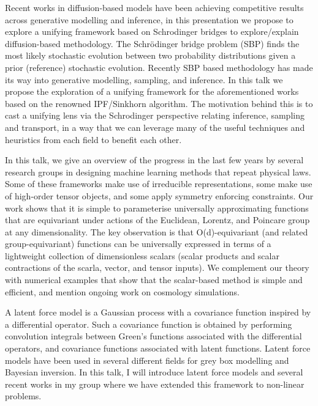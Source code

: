 \license

Recent works in diffusion-based models have been achieving competitive results across generative modelling and inference, in this presentation we propose to explore a unifying framework based on Schrodinger bridges to explore/explain diffusion-based methodology. The Schrödinger bridge problem (SBP) finds the most likely stochastic evolution between two probability distributions given a prior (reference) stochastic evolution. Recently SBP based methodology has made its way into generative modelling, sampling, and inference. In this talk we propose the exploration of a unifying framework for the aforementioned works based on the renowned IPF/Sinkhorn algorithm. The motivation behind this is to cast a unifying lens via the Schrodinger perspective relating inference, sampling and transport, in a way that we can leverage many of the useful techniques and heuristics from each field to benefit each other.

\license

In this talk, we give an overview of the progress in the last few years by several research groups in designing machine learning methods that repeat physical laws. Some of these frameworks make use of irreducible representations, some make use of high-order tensor objects, and some apply symmetry enforcing constraints. Our work shows that it is simple to parameterise universally approximating functions that are equivariant under actions of the Euclidean, Lorentz, and Poincare group at any dimensionality. The key observation is that O(d)-equivariant (and related group-equivariant) functions can be universally expressed in terms of a lightweight collection of dimensionless scalars (scalar products and scalar contractions of the scarla, vector, and tensor inputs). We complement our theory with numerical examples that show that the scalar-based method is simple and efficient, and mention ongoing work on cosmology simulations.

\license

A latent force model is a Gaussian process with a covariance function inspired by a differential operator. Such a covariance function is obtained by performing convolution integrals between Green's functions associated with the differential operators, and covariance functions associated with latent functions. Latent force models have been used in several different fields for grey box modelling and Bayesian inversion. In this talk, I will introduce latent force models and several recent works in my group where we have extended this framework to non-linear problems.
